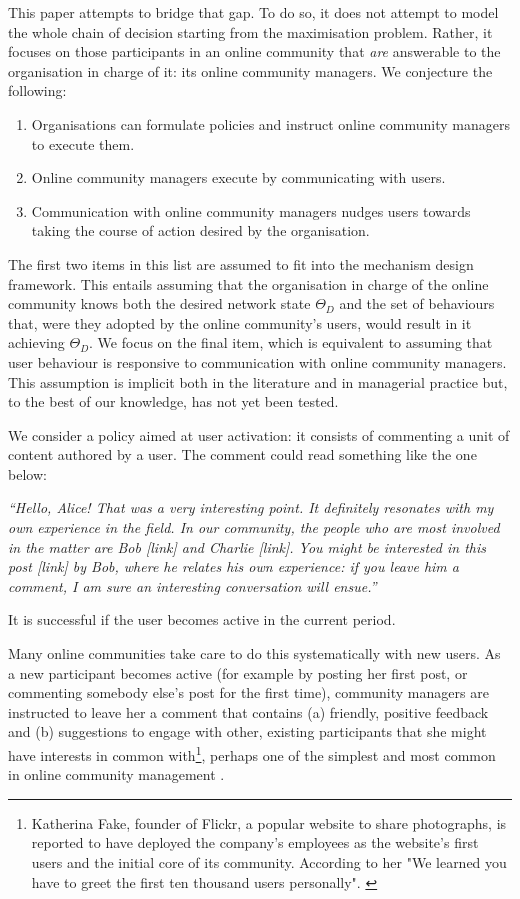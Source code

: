 This paper attempts to bridge that gap. To do so, it does not attempt to model the whole chain of decision starting from the maximisation problem. Rather, it focuses on those participants in an online community that \textit{are} answerable to the organisation in charge of it: its online community managers. We conjecture the following:

\begin{enumerate}
 	\item Organisations can formulate policies and instruct online community managers to execute them.
	 \item Online community managers execute by communicating with users.
	 \item Communication with online community managers nudges users towards taking the course of action desired by the organisation. 
 \end{enumerate}
 
The first two items in this list are assumed to fit into the mechanism design framework. This entails assuming that the organisation in charge of the online community knows both the desired network state $\Theta_D$ and the set of behaviours that, were they adopted by the online community's users, would result in it achieving $\Theta_D$. We focus on the final item, which is equivalent to assuming that user behaviour is responsive to communication with online community managers. This assumption is implicit both in the literature and in managerial practice but, to the best of our knowledge, has not yet been tested.

We consider a policy aimed at user activation: it consists of commenting a unit of content authored by a user. The comment could read something like the one below:

\emph{``Hello, Alice! That was a very interesting point. It definitely resonates with my own experience in the field. In our community, the people who are most involved in the matter are Bob [link] and Charlie [link]. You might be interested in this post [link] by Bob, where he relates his own experience: if you leave him a comment, I am sure an interesting conversation will ensue.''}

It is successful if the user becomes active in the current period.  

Many online communities take care to do this systematically with new users. As a new participant becomes active (for example by posting her first post, or commenting somebody else's post for the first time), community managers are instructed to leave her a comment that contains (a) friendly, positive feedback and (b) suggestions to engage with other, existing participants that she might have interests in common with\footnote{Katherina Fake, founder of Flickr, a popular website to share photographs, is reported to have deployed the company's employees as the website's first users and the initial core of its community. According to her "We learned you have to greet the first ten thousand users personally". \cite{shirky2008here}}, perhaps one of the simplest and most common in online community management \cite{rheingold1993virtual, shirky2008here}. 

